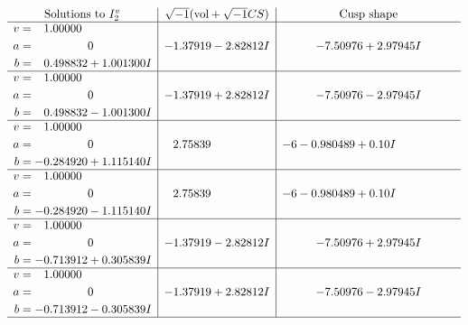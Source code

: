 \documentclass[1p]{elsarticle_modified}
\theoremstyle{definition}
\newcommand{\I}{\sqrt{-1}}
\begin{document}
$$\begin{array}{c|c|c}  
\text{Solutions to }I^v_{2}& \I (\text{vol} + \sqrt{-1}CS) & \text{Cusp shape}\\
 \hline 
\begin{aligned}
v &= \phantom{-}1.00000\phantom{ +0.000000I} \\
a &= \phantom{-0.000000 } 0 \\
b &= \phantom{-}0.498832 + 1.001300 I\end{aligned}
 & -1.37919 - 2.82812 I & -7.50976 + 2.97945 I \\ \hline\begin{aligned}
v &= \phantom{-}1.00000\phantom{ +0.000000I} \\
a &= \phantom{-0.000000 } 0 \\
b &= \phantom{-}0.498832 - 1.001300 I\end{aligned}
 & -1.37919 + 2.82812 I & -7.50976 - 2.97945 I \\ \hline\begin{aligned}
v &= \phantom{-}1.00000\phantom{ +0.000000I} \\
a &= \phantom{-0.000000 } 0 \\
b &= -0.284920 + 1.115140 I\end{aligned}
 & \phantom{-}2.75839\phantom{ +0.000000I} &                  -6
-0.980489 + 0. 10   I\phantom{ +0.000000I} \\ \hline\begin{aligned}
v &= \phantom{-}1.00000\phantom{ +0.000000I} \\
a &= \phantom{-0.000000 } 0 \\
b &= -0.284920 - 1.115140 I\end{aligned}
 & \phantom{-}2.75839\phantom{ +0.000000I} &                  -6
-0.980489 + 0. 10   I\phantom{ +0.000000I} \\ \hline\begin{aligned}
v &= \phantom{-}1.00000\phantom{ +0.000000I} \\
a &= \phantom{-0.000000 } 0 \\
b &= -0.713912 + 0.305839 I\end{aligned}
 & -1.37919 - 2.82812 I & -7.50976 + 2.97945 I \\ \hline\begin{aligned}
v &= \phantom{-}1.00000\phantom{ +0.000000I} \\
a &= \phantom{-0.000000 } 0 \\
b &= -0.713912 - 0.305839 I\end{aligned}
 & -1.37919 + 2.82812 I & -7.50976 - 2.97945 I\\
 \hline 
 \end{array}$$\newpage
\end{document}
